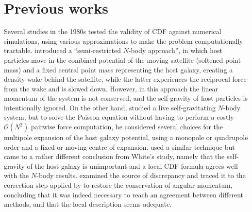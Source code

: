 \documentclass[twocolumn]{aastex63}
\begin{document}
\section{Previous works}   \label{sec:literature}

Several studies in the 1980s tested the validity of CDF against numerical simulations, using various approximations to make the problem computationally tractable.
\citet{Lin1983} introduced a ``semi-restricted $N$-body approach'', in which host particles move in the combined potential of the moving satellite (softened point mass) and a fixed central point mass representing the host galaxy, creating a density wake behind the satellite, while the latter experiences the reciprocal force from the wake and is slowed down. However, in this approach the linear momentum of the system is not conserved, and the self-gravity of host particles is intentionally ignored. On the other hand, \citet{White1983} studied a live self-gravitating $N$-body system, but to solve the Poisson equation without having to perform a costly $\mathcal O(N^2)$ pairwise force computation, he considered several choices for the multipole expansion of the host galaxy potential, using a monopole or quadrupole order and a fixed or moving centre of expansion. \citet{Bontekoe1987} used a similar technique but came to a rather different conclusion from White's study, namely that the self-gravity of the host galaxy is unimportant and a local CDF formula agrees well with the $N$-body results. \citet{Zaritsky1988} examined the source of discrepancy and traced it to the correction step applied by \citet{Bontekoe1987} to restore the conservation of angular momentum, concluding that it was indeed necessary to reach an agreement between different methods, and that the local description seems adequate. 
\end{document}
